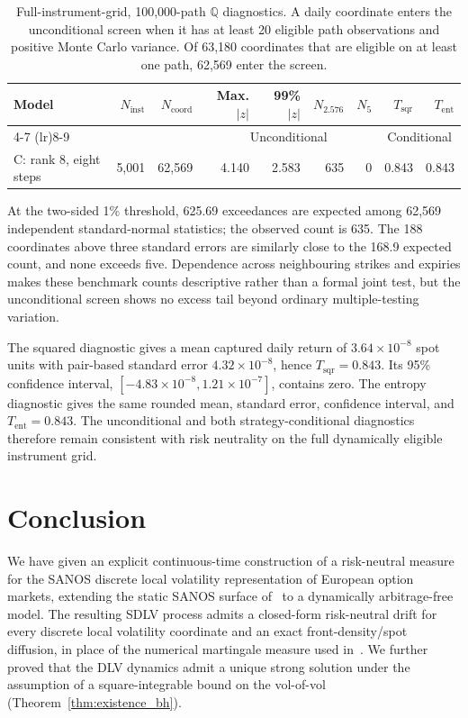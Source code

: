 \documentclass[11pt]{article}
\newcommand{\Q}{\mathbb Q}
\newcommand{\abs}[1]{\lvert #1\rvert}
\theoremstyle{plain}
\theoremstyle{definition}
\theoremstyle{remark}
\begin{document}
\begin{table}[H]
\centering
\small
\begin{tabular}{lrrrrrrrr}
\toprule
Model & $N_{\mathrm{inst}}$ & $N_{\mathrm{coord}}$
  & Max. $\abs{z}$ & 99\% $\abs{z}$
  & $N_{2.576}$ & $N_5$ & $T_{\mathrm{sqr}}$ & $T_{\mathrm{ent}}$\\
\cmidrule(lr){4-7}
\cmidrule(lr){8-9}
 & & & \multicolumn{4}{c}{Unconditional} & \multicolumn{2}{c}{Conditional}\\
\midrule
C: rank 8, eight steps
  & 5,001 & 62,569 & {\color{orange}4.140} & 2.583 & 635 & 0 & 0.843 & 0.843\\
\bottomrule
\end{tabular}
\caption{Full-instrument-grid, 100,000-path $\Q$ diagnostics.  A daily
coordinate enters the unconditional screen when it has at least 20 eligible
path observations and positive Monte Carlo variance.  Of 63,180 coordinates
that are eligible on at least one path, 62,569 enter the screen.}
\label{tab:numerics-full-instrument-grid}
\end{table}

At the two-sided 1\% threshold, 625.69 exceedances are expected among 62,569
independent standard-normal statistics; the observed count is 635.  The 188
coordinates above three standard errors are similarly close to the 168.9
expected count, and none exceeds five.  Dependence across neighbouring strikes
and expiries makes these benchmark counts descriptive rather than a formal
joint test, but the unconditional screen shows no excess tail beyond ordinary
multiple-testing variation.

The squared diagnostic gives a mean captured daily return of
$3.64\times10^{-8}$ spot units with pair-based standard error
$4.32\times10^{-8}$, hence $T_{\mathrm{sqr}}=0.843$.  Its 95\% confidence
interval, $[-4.83\times10^{-8},1.21\times10^{-7}]$, contains zero.  The entropy
diagnostic gives the same rounded mean, standard error, confidence interval,
and $T_{\mathrm{ent}}=0.843$.  The unconditional and both
strategy-conditional diagnostics therefore remain consistent with risk
neutrality on the full dynamically eligible instrument grid.

\section{Conclusion}

We have given an explicit continuous-time construction of a risk-neutral measure for the SANOS
discrete local volatility representation of European option markets, extending the static
SANOS surface of~\cite{SANOS2026} to a dynamically arbitrage-free model. The resulting SDLV
process admits a closed-form risk-neutral drift for every discrete local volatility coordinate
and an exact front-density/spot diffusion, in place of the numerical martingale measure
used in~\cite{DYSANOS2026}. We further proved that the DLV dynamics admit a unique strong solution under
the assumption of a square-integrable bound on the vol-of-vol (Theorem~\ref{thm:existence_bh}).
\end{document}
